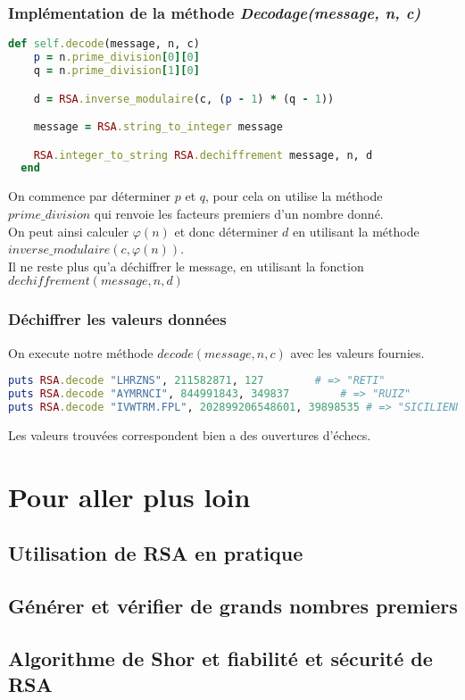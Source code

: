 \documentclass[a4paper,10pt]{article}
\begin{document}
\clearpage
\subsubsection{Implémentation de la méthode \textit{Decodage(message, n, c)}}
\begin{lstlisting}[language=Ruby]
  def self.decode(message, n, c)
    p = n.prime_division[0][0]
    q = n.prime_division[1][0]

    d = RSA.inverse_modulaire(c, (p - 1) * (q - 1))

    message = RSA.string_to_integer message

    RSA.integer_to_string RSA.dechiffrement message, n, d
  end
\end{lstlisting}
On commence par déterminer $p$ et $q$, pour cela on utilise la méthode $prime\_division$ qui renvoie les facteurs premiers d'un nombre donné.\\
On peut ainsi calculer $\varphi(n)$ et donc déterminer $d$ en utilisant la méthode $inverse\_modulaire(c, \varphi(n))$.\\
Il ne reste plus qu'a déchiffrer le message, en utilisant la fonction $dechiffrement(message, n, d)$

\subsubsection{Déchiffrer les valeurs données}
On execute notre méthode $decode(message, n, c)$ avec les valeurs fournies.
\begin{lstlisting}[language=Ruby]
puts RSA.decode "LHRZNS", 211582871, 127		# => "RETI"
puts RSA.decode "AYMRNCI", 844991843, 349837		# => "RUIZ"
puts RSA.decode "IVWTRM.FPL", 202899206548601, 39898535	# => "SICILIENNE"
\end{lstlisting}
Les valeurs trouvées correspondent bien a des ouvertures d'échecs.

\clearpage
\section{Pour aller plus loin}
\subsection{Utilisation de RSA en pratique}
\subsection{Générer et vérifier de grands nombres premiers}
\subsection{Algorithme de Shor et fiabilité et sécurité de RSA}
\end{document}
